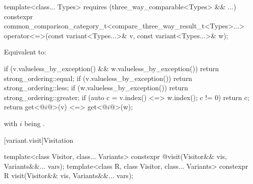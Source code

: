 %
\begin{itemdecl}
template<class... Types> requires (three_way_comparable<Types> && ...)
  constexpr common_comparison_category_t<compare_three_way_result_t<Types>...>
    operator<=>(const variant<Types...>& v, const variant<Types...>& w);
\end{itemdecl}

\begin{itemdescr}
\pnum
\effects
Equivalent to:
\begin{codeblock}
if (v.valueless_by_exception() && w.valueless_by_exception())
  return strong_ordering::equal;
if (v.valueless_by_exception()) return strong_ordering::less;
if (w.valueless_by_exception()) return strong_ordering::greater;
if (auto c = v.index() <=> w.index(); c != 0) return c;
return get<@$i$@>(v) <=> get<@$i$@>(w);
\end{codeblock}
with $i$ being .
\end{itemdescr}

[variant.visit]{Visitation}

%
%
\begin{itemdecl}
template<class Visitor, class... Variants>
  constexpr @\seebelow@ visit(Visitor&& vis, Variants&&... vars);
template<class R, class Visitor, class... Variants>
  constexpr R visit(Visitor&& vis, Variants&&... vars);
\end{itemdecl}

